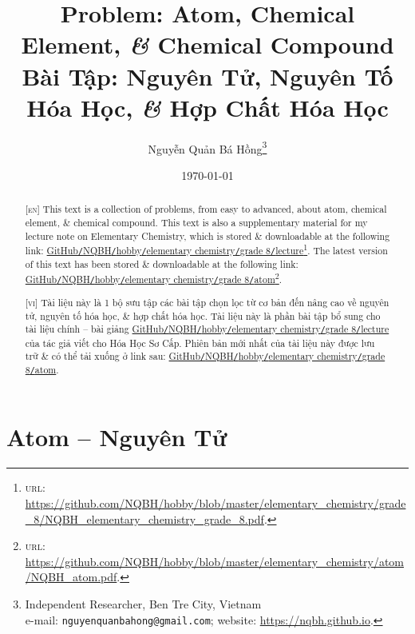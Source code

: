 \documentclass{article}
\title{Problem: Atom, Chemical Element, \textit{\&} Chemical Compound\\Bài Tập: Nguyên Tử, Nguyên Tố Hóa Học, \textit{\&} Hợp Chất Hóa Học}
\author{Nguyễn Quản Bá Hồng\footnote{Independent Researcher, Ben Tre City, Vietnam\\e-mail: \texttt{nguyenquanbahong@gmail.com}; website: \url{https://nqbh.github.io}.}}
\date{\today}
\begin{document}
\maketitle
\begin{abstract}
	\textsc{[en]} This text is a collection of problems, from easy to advanced, about atom, chemical element, \& chemical compound. This text is also a supplementary material for my lecture note on Elementary Chemistry, which is stored \& downloadable at the following link: \href{https://github.com/NQBH/hobby/blob/master/elementary_chemistry/grade_8/NQBH_elementary_chemistry_grade_8.pdf}{GitHub\texttt{/}NQBH\texttt{/}hobby\texttt{/}elementary chemistry\texttt{/}grade 8\texttt{/}lecture}\footnote{\textsc{url}: \url{https://github.com/NQBH/hobby/blob/master/elementary_chemistry/grade_8/NQBH_elementary_chemistry_grade_8.pdf}.}. The latest version of this text has been stored \& downloadable at the following link: \href{https://github.com/NQBH/hobby/blob/master/elementary_chemistry/chemical_reaction/NQBH_chemical_reaction.pdf}{GitHub\texttt{/}NQBH\texttt{/}hobby\texttt{/}elementary chemistry\texttt{/}grade 8\texttt{/}atom}\footnote{\textsc{url}: \url{https://github.com/NQBH/hobby/blob/master/elementary_chemistry/atom/NQBH_atom.pdf}.}.
	\vspace{2mm}
	
	\textsc{[vi]} Tài liệu này là 1 bộ sưu tập các bài tập chọn lọc từ cơ bản đến nâng cao về nguyên tử, nguyên tố hóa học, \& hợp chất hóa học. Tài liệu này là phần bài tập bổ sung cho tài liệu chính -- bài giảng \href{https://github.com/NQBH/hobby/blob/master/elementary_chemistry/grade_8/NQBH_elementary_chemistry_grade_8.pdf}{GitHub\texttt{/}NQBH\texttt{/}hobby\texttt{/}elementary chemistry\texttt{/}grade 8\texttt{/}lecture} của tác giả viết cho Hóa Học Sơ Cấp. Phiên bản mới nhất của tài liệu này được lưu trữ \& có thể tải xuống ở link sau: \href{https://github.com/NQBH/hobby/blob/master/elementary_chemistry/grade_8/real/NQBH_real.pdf}{GitHub\texttt{/}NQBH\texttt{/}hobby\texttt{/}elementary chemistry\texttt{/}grade 8\texttt{/}atom}.
\end{abstract}
\setcounter{secnumdepth}{4}
\setcounter{tocdepth}{3}
\tableofcontents
\newpage


\section{Atom -- Nguyên Tử}
\end{document}
